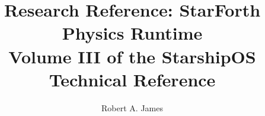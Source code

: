 


\title{Research Reference: StarForth Physics Runtime\\[0.5em]
       \large Volume III of the StarshipOS Technical Reference}
\author{Robert A. James}
\date{%
}


\maketitle
\tableofcontents










\appendix






